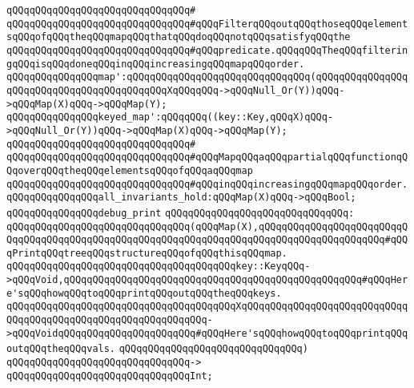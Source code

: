 \verb|qQQqqQQqqQQqqQQqqQQqqQQqqQQqqQQq#|\newline
\verb|qQQqqQQqqQQqqQQqqQQqqQQqqQQqqQQq#qQQqFilterqQQqoutqQQqthoseqQQqelementsqQQqofqQQqtheqQQqmapqQQqthatqQQqdoqQQqnotqQQqsatisfyqQQqthe|\newline
\verb|qQQqqQQqqQQqqQQqqQQqqQQqqQQqqQQq#qQQqpredicate.qQQqqQQqTheqQQqfilteringqQQqisqQQqdoneqQQqinqQQqincreasingqQQqmapqQQqorder.|\newline
\newline
\verb|qQQqqQQqqQQqqQQqmap':qQQqqQQqqQQqqQQqqQQqqQQqqQQqqQQq(qQQqqQQqqQQqqQQqqQQqqQQqqQQqqQQqqQQqqQQqqQQqXqQQqqQQq->qQQqNull_Or(Y))qQQq->qQQqMap(X)qQQq->qQQqMap(Y);|\newline
\verb|qQQqqQQqqQQqqQQqkeyed_map':qQQqqQQq((key::Key,qQQqX)qQQq->qQQqNull_Or(Y))qQQq->qQQqMap(X)qQQq->qQQqMap(Y);|\newline
\verb|qQQqqQQqqQQqqQQqqQQqqQQqqQQqqQQq#|\newline
\verb|qQQqqQQqqQQqqQQqqQQqqQQqqQQqqQQq#qQQqMapqQQqaqQQqpartialqQQqfunctionqQQqoverqQQqtheqQQqelementsqQQqofqQQqaqQQqmap|\newline
\verb|qQQqqQQqqQQqqQQqqQQqqQQqqQQqqQQq#qQQqinqQQqincreasingqQQqmapqQQqorder.|\newline
\newline
\newline
\verb|qQQqqQQqqQQqqQQqall_invariants_hold:qQQqMap(X)qQQq->qQQqBool;|\newline
\newline
\verb|qQQqqQQqqQQqqQQqdebug_print|\newline
\verb|qQQqqQQqqQQqqQQqqQQqqQQqqQQqqQQq:|\newline
\verb|qQQqqQQqqQQqqQQqqQQqqQQqqQQqqQQq(qQQqMap(X),qQQqqQQqqQQqqQQqqQQqqQQqqQQqqQQqqQQqqQQqqQQqqQQqqQQqqQQqqQQqqQQqqQQqqQQqqQQqqQQqqQQqqQQqqQQq#qQQqPrintqQQqtreeqQQqstructureqQQqofqQQqthisqQQqmap.|\newline
\verb|qQQqqQQqqQQqqQQqqQQqqQQqqQQqqQQqqQQqqQQqkey::KeyqQQq->qQQqVoid,qQQqqQQqqQQqqQQqqQQqqQQqqQQqqQQqqQQqqQQqqQQqqQQqqQQq#qQQqHere'sqQQqhowqQQqtoqQQqprintqQQqoutqQQqtheqQQqkeys.|\newline
\verb|qQQqqQQqqQQqqQQqqQQqqQQqqQQqqQQqqQQqqQQqXqQQqqQQqqQQqqQQqqQQqqQQqqQQqqQQqqQQqqQQqqQQqqQQqqQQqqQQqqQQqqQQq->qQQqVoidqQQqqQQqqQQqqQQqqQQqqQQq#qQQqHere'sqQQqhowqQQqtoqQQqprintqQQqoutqQQqtheqQQqvals.|\newline
\verb|qQQqqQQqqQQqqQQqqQQqqQQqqQQqqQQq)|\newline
\verb|qQQqqQQqqQQqqQQqqQQqqQQqqQQqqQQq->|\newline
\verb|qQQqqQQqqQQqqQQqqQQqqQQqqQQqqQQqInt;|\newline

